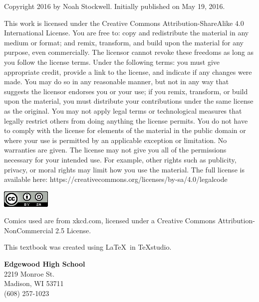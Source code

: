 \documentclass[../revisedmain.tex]{subfiles}
\begin{document}
	\par Copyright 2016 by Noah Stockwell. Initially published on May 19, 2016.\\\par This work is licensed under the Creative Commons Attribution-ShareAlike 4.0 International License. You are free to: copy and redistribute the material in any medium or format; and remix, transform, and build upon the material for any purpose, even commercially. The licensor cannot revoke these freedoms as long as you follow the license terms. Under the following terms: you must give appropriate credit, provide a link to the license, and indicate if any changes were made. You may do so in any reasonable manner, but not in any way that suggests the licensor endorses you or your use; if you remix, transform, or build upon the material, you must distribute your contributions under the same license as the original. You may not apply legal terms or technological measures that legally restrict others from doing anything the license permits. You do not have to comply with the license for elements of the material in the public domain or where your use is permitted by an applicable exception or limitation. No warranties are given. The license may not give you all of the permissions necessary for your intended use. For example, other rights such as publicity, privacy, or moral rights may limit how you use the material. The full license is available here: https://creativecommons.org/licenses/by-sa/4.0/legalcode\\
	\begin{center}\includegraphics[width=.5in]{license}\end{center}\vfill
	\par Comics used are from xkcd.com, licensed under a Creative Commons Attribution-NonCommercial 2.5 License.\\
	\vspace{.25in}\par This textbook was created using \LaTeX\, in TeXstudio.\\
	\vspace{.25in}
	\begin{flushright}
	\textbf{Edgewood High School}\\
	2219 Monroe St.\\ Madison, WI 53711\\ (608) 257-1023
	\end{flushright}
\end{document}
